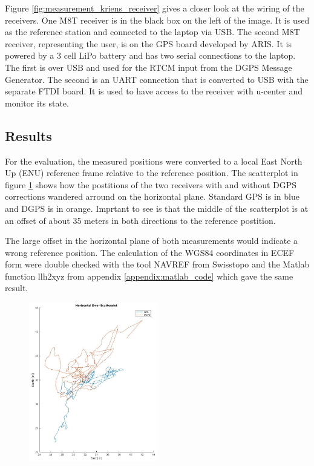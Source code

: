 Figure \ref{fig:measurement_kriens_receiver} gives a closer look at the wiring of the receivers.
One M8T receiver is in the black box on the left of the image.
It is used as the reference station and connected to the laptop via USB.
The second M8T receiver, representing the user, is on the GPS board developed by ARIS.
It is powered by a 3 cell LiPo battery and has two serial connections to the laptop.
The first is over USB and used for the RTCM input from the DGPS Message Generator.
The second is an UART connection that is converted to USB with the separate FTDI board.
It is used to have access to the receiver with u-center and monitor its state.

\subsection{Results}

For the evaluation, the measured positions were converted to a local East North Up (ENU) reference frame relative to the reference position.
The scatterplot in figure \ref{fig:scatterplot} shows how the postitions of the two receivers with and without DGPS corrections wandered arround on the horizontal plane.
Standard GPS is in blue and DGPS is in orange.
Imprtant to see is that the middle of the scatterplot is at an offset of about 35 meters in both directions to the reference postition.
  
The large offset in the horizontal plane of both measurements would indicate a wrong reference position.
The calculation of the WGS84 coordinates in ECEF form were double checked with the tool NAVREF from Swisstopo and the Matlab function llh2xyz from appendix \ref{appendix:matlab_code} which gave the same result.

\begin{figure}
  \centering
 \includegraphics[width=0.5\textwidth]{images/Scatterplot.jpg}
 \label{fig:scatterplot}
\end{figure}


